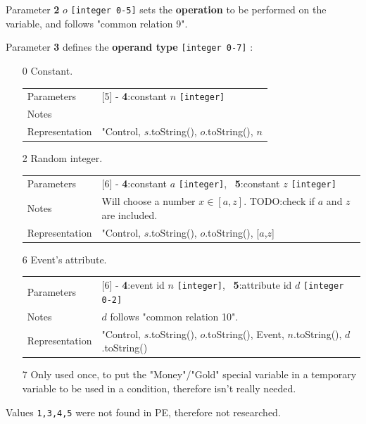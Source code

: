 \documentclass[11pt]{article}
\begin{document}
Parameter \textbf{2} $o$ \verb|[integer 0-5]| sets the \textbf{operation} to be performed on the variable, and follows "common relation 9".

Parameter \textbf{3} defines the \textbf{operand type} \verb|[integer 0-7]| :
\begin{itemize}
	
	\item[0] Constant.
	
	\begin{tabular}{|a l|}
		\hline
		Parameters & [5] - \textbf{4}:constant $n$ \verb|[integer]| \\
		Notes &  \\
		Representation & "Control, $s$.toString(), $o$.toString(), $n$ \\
		\hline
	\end{tabular}
	
	\item[2] Random integer.
	
	\begin{tabular}{|a l|}
		\hline
		Parameters & [6] - \textbf{4}:constant $a$ \verb|[integer]|, \ \textbf{5}:constant $z$ \verb|[integer]| \\
		Notes & Will choose a number $x \in [a,z]$. TODO:check if $a$ and $z$ are included. \\
		Representation & "Control, $s$.toString(), $o$.toString(), [$a$,$z$] \\
		\hline
	\end{tabular}
	
	\item[6] Event's attribute.
	
	\begin{tabular}{|a l|}
		\hline
		Parameters & [6] - \textbf{4}:event id $n$ \verb|[integer]|, \ \textbf{5}:attribute id $d$ \verb|[integer 0-2]| \\
		Notes & $d$ follows "common relation 10". \\
		Representation & "Control, $s$.toString(), $o$.toString(), Event, $n$.toString(), $d$.toString() \\
		\hline
	\end{tabular}
	
	\item[7] Only used once, to put the "Money"/"Gold" special variable in a temporary variable to be used in a condition, therefore isn't really needed.
	
\end{itemize}

Values \verb|1,3,4,5| were not found in PE, therefore not researched.
\end{document}
